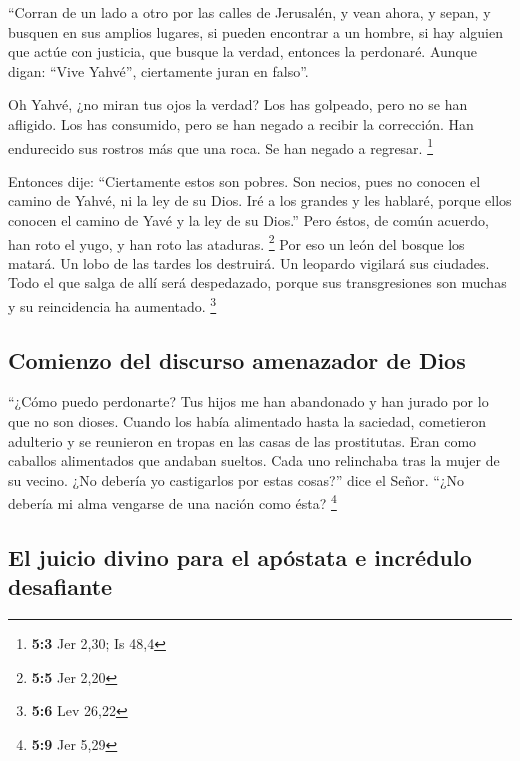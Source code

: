  ``Corran de un lado a otro por las calles de Jerusalén, y
vean ahora, y sepan, y busquen en sus amplios lugares, si pueden
encontrar a un hombre, si hay alguien que actúe con justicia, que busque
la verdad, entonces la perdonaré.  Aunque digan: ``Vive
Yahvé'', ciertamente juran en falso''.

 Oh Yahvé, ¿no miran tus ojos la verdad? Los has golpeado,
pero no se han afligido. Los has consumido, pero se han negado a recibir
la corrección. Han endurecido sus rostros más que una roca. Se han
negado a regresar. \footnote{\textbf{5:3} Jer 2,30; Is 48,4}

 Entonces dije: ``Ciertamente estos son pobres. Son
necios, pues no conocen el camino de Yahvé, ni la ley de su Dios.
 Iré a los grandes y les hablaré, porque ellos conocen el
camino de Yavé y la ley de su Dios.'' Pero éstos, de común acuerdo, han
roto el yugo, y han roto las ataduras. \footnote{\textbf{5:5} Jer 2,20}
 Por eso un león del bosque los matará. Un lobo de las
tardes los destruirá. Un leopardo vigilará sus ciudades. Todo el que
salga de allí será despedazado, porque sus transgresiones son muchas y
su reincidencia ha aumentado. \footnote{\textbf{5:6} Lev 26,22}

\hypertarget{comienzo-del-discurso-amenazador-de-dios}{%
\subsection{Comienzo del discurso amenazador de
Dios}\label{comienzo-del-discurso-amenazador-de-dios}}

 ``¿Cómo puedo perdonarte? Tus hijos me han abandonado y
han jurado por lo que no son dioses. Cuando los había alimentado hasta
la saciedad, cometieron adulterio y se reunieron en tropas en las casas
de las prostitutas.  Eran como caballos alimentados que
andaban sueltos. Cada uno relinchaba tras la mujer de su vecino.
 ¿No debería yo castigarlos por estas cosas?'' dice el
Señor. ``¿No debería mi alma vengarse de una nación como ésta?
\footnote{\textbf{5:9} Jer 5,29}

\hypertarget{el-juicio-divino-para-el-apuxf3stata-e-incruxe9dulo-desafiante}{%
\subsection{El juicio divino para el apóstata e incrédulo
desafiante}\label{el-juicio-divino-para-el-apuxf3stata-e-incruxe9dulo-desafiante}}

